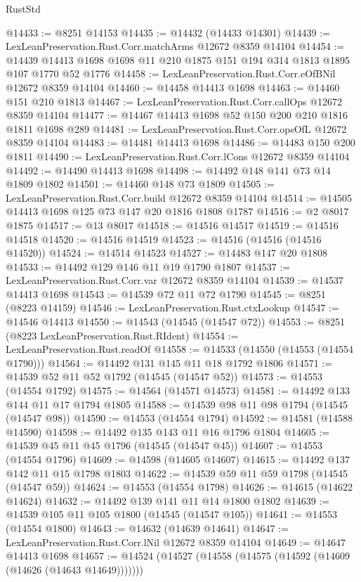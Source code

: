 \begin{lexlean}{RustStd}
\begin{coremodule}
@14433 := @8251 @14153
@14435 := @14432 (@14433 @14301)
@14439 := LexLeanPreservation.Rust.Corr.matchArms @12672 @8359 @14104
@14454 := @14439 @14413 @1698 @1698 @11 @210 @1875 @151 @194 @314 @1813 @1895 @107 @1770 @52 @1776
@14458 := LexLeanPreservation.Rust.Corr.eOfBNil @12672 @8359 @14104
@14460 := @14458 @14413 @1698
@14463 := @14460 @151 @210 @1813
@14467 := LexLeanPreservation.Rust.Corr.callOps @12672 @8359 @14104
@14477 := @14467 @14413 @1698 @52 @150 @200 @210 @1816 @1811 @1698 @289
@14481 := LexLeanPreservation.Rust.Corr.opsOfL @12672 @8359 @14104
@14483 := @14481 @14413 @1698
@14486 := @14483 @150 @200 @1811
@14490 := LexLeanPreservation.Rust.Corr.lCons @12672 @8359 @14104
@14492 := @14490 @14413 @1698
@14498 := @14492 @148 @141 @73 @14 @1809 @1802
@14501 := @14460 @148 @73 @1809
@14505 := LexLeanPreservation.Rust.Corr.build @12672 @8359 @14104
@14514 := @14505 @14413 @1698 @125 @73 @147 @20 @1816 @1808 @1787
@14516 := @2 @8017 @1875
@14517 := @13 @8017
@14518 := @14516 @14517
@14519 := @14516 @14518
@14520 := @14516 @14519
@14523 := @14516 (@14516 (@14516 @14520))
@14524 := @14514 @14523
@14527 := @14483 @147 @20 @1808
@14533 := @14492 @129 @146 @11 @19 @1790 @1807
@14537 := LexLeanPreservation.Rust.Corr.var @12672 @8359 @14104
@14539 := @14537 @14413 @1698
@14543 := @14539 @72 @11 @72 @1790
@14545 := @8251 (@8223 @14159)
@14546 := LexLeanPreservation.Rust.ctxLookup
@14547 := @14546 @14413
@14550 := @14543 (@14545 (@14547 @72))
@14553 := @8251 (@8223 LexLeanPreservation.Rust.RIdent)
@14554 := LexLeanPreservation.Rust.readOf
@14558 := @14533 (@14550 (@14553 (@14554 @1790)))
@14564 := @14492 @131 @145 @11 @18 @1792 @1806
@14571 := @14539 @52 @11 @52 @1792 (@14545 (@14547 @52))
@14573 := @14553 (@14554 @1792)
@14575 := @14564 (@14571 @14573)
@14581 := @14492 @133 @144 @11 @17 @1794 @1805
@14588 := @14539 @98 @11 @98 @1794 (@14545 (@14547 @98))
@14590 := @14553 (@14554 @1794)
@14592 := @14581 (@14588 @14590)
@14598 := @14492 @135 @143 @11 @16 @1796 @1804
@14605 := @14539 @45 @11 @45 @1796 (@14545 (@14547 @45))
@14607 := @14553 (@14554 @1796)
@14609 := @14598 (@14605 @14607)
@14615 := @14492 @137 @142 @11 @15 @1798 @1803
@14622 := @14539 @59 @11 @59 @1798 (@14545 (@14547 @59))
@14624 := @14553 (@14554 @1798)
@14626 := @14615 (@14622 @14624)
@14632 := @14492 @139 @141 @11 @14 @1800 @1802
@14639 := @14539 @105 @11 @105 @1800 (@14545 (@14547 @105))
@14641 := @14553 (@14554 @1800)
@14643 := @14632 (@14639 @14641)
@14647 := LexLeanPreservation.Rust.Corr.lNil @12672 @8359 @14104
@14649 := @14647 @14413 @1698
@14657 := @14524 (@14527 (@14558 (@14575 (@14592 (@14609 (@14626 (@14643 @14649)))))))

\end{coremodule}
\end{lexlean}
